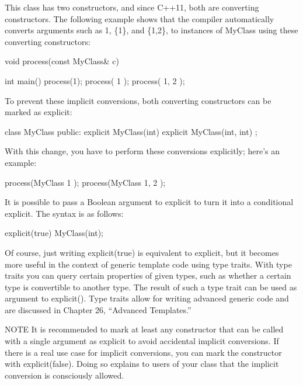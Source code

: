 This class has two constructors, and since C++11, both are converting constructors. The following example shows that the compiler automatically converts arguments such as 1, \{1\}, and \{1,2\}, to instances of MyClass using these converting constructors:

\begin{cpp}
void process(const MyClass& c) { }

int main()
{
    process(1);
    process({ 1 });
    process({ 1, 2 });
}
\end{cpp}

To prevent these implicit conversions, both converting constructors can be marked as explicit:

\begin{cpp}
class MyClass
{
    public:
    explicit MyClass(int) { }
    explicit MyClass(int, int) { }
};
\end{cpp}

With this change, you have to perform these conversions explicitly; here’s an example:

\begin{cpp}
process(MyClass{ 1 });
process(MyClass{ 1, 2 });
\end{cpp}

It is possible to pass a Boolean argument to explicit to turn it into a conditional explicit. The syntax is as follows:

\begin{cpp}
explicit(true) MyClass(int);
\end{cpp}

Of course, just writing explicit(true) is equivalent to explicit, but it becomes more useful in the context of generic template code using type traits. With type traits you can query certain properties of given types, such as whether a certain type is convertible to another type. The result of such a type trait can be used as argument to explicit(). Type traits allow for writing advanced generic code and are discussed in Chapter 26, “Advanced Templates.”

\begin{myNotic}{NOTE}
It is recommended to mark at least any constructor that can be called with a single argument as explicit to avoid accidental implicit conversions. If there is a real use case for implicit conversions, you can mark the constructor with explicit(false). Doing so explains to users of your class that the implicit conversion is consciously allowed.
\end{myNotic}

